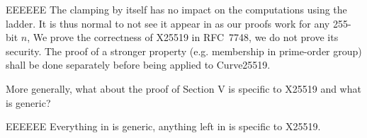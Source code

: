 \begin{answer}{EEEEEE}
The clamping by itself has no impact on the computations using the ladder.
It is thus normal to not see it appear in  as our proofs work for any 255-bit $n$,
We prove the correctness of X25519 in RFC~7748, we do not prove its security.
The proof of a stronger property (e.g. membership in prime-order group)
shall be done separately before being applied to Curve25519.
\end{answer}

More generally, what about the proof of Section V is
specific to X25519 and what is generic?

\begin{answer}{EEEEEE}
Everything in  is generic, anything left in 
is specific to X25519.
\end{answer}
